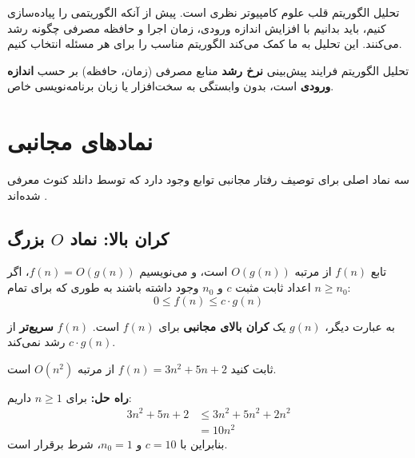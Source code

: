 \documentclass{matinbook}
\begin{document}
    تحلیل الگوریتم قلب علوم کامپیوتر نظری است.
    پیش از آنکه الگوریتمی را پیاده‌سازی کنیم، باید بدانیم
    با افزایش اندازه ورودی، زمان اجرا و حافظه مصرفی
    چگونه رشد می‌کنند. این تحلیل به ما کمک می‌کند
    الگوریتم مناسب را برای هر مسئله انتخاب کنیم.
    
    \begin{definition}
        تحلیل الگوریتم فرایند پیش‌بینی \textbf{نرخ رشد}
        منابع مصرفی (زمان، حافظه) بر حسب \textbf{اندازه ورودی}
        است، بدون وابستگی به سخت‌افزار یا زبان برنامه‌نویسی خاص.
        \label{def:algorithm-analysis}
    \end{definition}
    
    \section{نمادهای مجانبی}
    
    سه نماد اصلی برای توصیف رفتار مجانبی توابع
    وجود دارد که توسط دانلد کنوث
    معرفی شده‌اند \cite{knuth1984}.
    
    \subsection{کران بالا: نماد $O$ بزرگ}
    
    \begin{definition}[$O$-بزرگ]
        تابع $f(n)$ از مرتبه $O(g(n))$ است،
        و می‌نویسیم $f(n) = O(g(n))$، اگر اعداد ثابت
        مثبت $c$ و $n_{0}$ وجود داشته باشند
        به طوری که برای تمام $n \geq n_{0}$:
        \[
        0 \leq f(n) \leq c \cdot g(n)
        \]
        \label{def:big-o}
    \end{definition}
    
    به عبارت دیگر، $g(n)$ یک \textbf{کران بالای مجانبی}
    برای $f(n)$ است. $f(n)$ \textbf{سریع‌تر} از
    $c \cdot g(n)$ رشد نمی‌کند.
    
    \begin{example}
        ثابت کنید $f(n) = 3n^{2} + 5n + 2$ از مرتبه $O(n^{2})$ است.
        
        \textbf{راه حل:}
        برای $n \geq 1$ داریم:
        \begin{align*}
            3n^{2} + 5n + 2 &\leq 3n^{2} + 5n^{2} + 2n^{2} \\
            &= 10n^{2}
        \end{align*}
        بنابراین با $c = 10$ و $n_{0} = 1$،
        شرط برقرار است.
        \label{ex:big-o-proof}
    \end{example}
    
\end{document}
